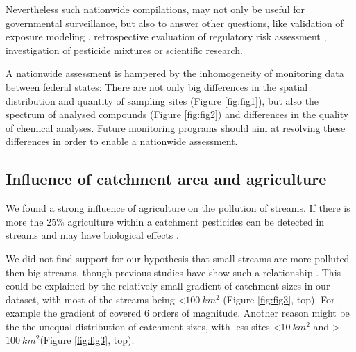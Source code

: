 \documentclass[journal=esthag,manuscript=article]{achemso}
\begin{document}
Nevertheless such nationwide compilations, may not only be useful for governmental surveillance, but also to answer other questions, like validation of exposure modeling , retrospective evaluation of regulatory risk assessment \citep{knauer_pesticides_2016,stehle_pesticide_2015}, investigation of pesticide mixtures  or scientific research.

A nationwide assessment is hampered  by the inhomogeneity of monitoring data between federal states:
There are not only big differences in the spatial distribution and quantity of sampling sites (Figure \ref{fig:fig1}), but also the spectrum of analysed compounds (Figure \ref{fig:fig2}) and differences in the quality of chemical analyses.
Future monitoring programs should aim at resolving these differences in order to enable a nationwide assessment. 



\subsection{Influence of catchment area and agriculture}
We found a strong influence of agriculture on the pollution of streams.
If there is more the 25\% agriculture within a catchment pesticides can be detected in streams and may have biological effects .

We did not find support for our hypothesis that small streams are more polluted then big streams, though previous studies have show such a relationship \citep{schulz_field_2004,stehle_pesticide_2015}.
This could be explained by the relatively small gradient of catchment sizes in our dataset, with most of the streams being \textless $100~km^2$ (Figure \ref{fig:fig3}, top).
For example the gradient of \citet{schulz_field_2004} covered 6 orders of magnitude.
Another reason might be the the unequal distribution of catchment sizes, with less sites \textless $10~km^2$ and \textgreater $100~km^2$(Figure \ref{fig:fig3}, top).









\end{document}
